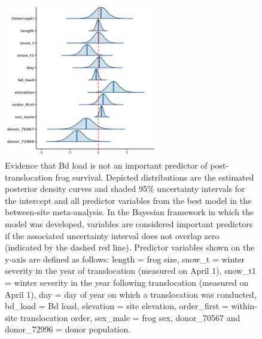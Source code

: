 \documentclass[9pt,twoside,lineno]{pnas-new}
\begin{document}
\begin{figure}

{\centering \includegraphics[width=0.60\textwidth]{figures/mcmc_areas_m1d.png}

}

\caption{\label{fig-survival-postdens}Evidence that Bd load is not an
important predictor of post-translocation frog survival. Depicted
distributions are the estimated posterior density curves and shaded 95\%
uncertainty intervals for the intercept and all predictor variables from
the best model in the between-site meta-analysis. In the Bayesian
framework in which the model was developed, variables are considered
important predictors if the associated uncertainty interval does not
overlap zero (indicated by the dashed red line). Predictor variables
shown on the y-axis are defined as follows: length = frog size, snow\_t
= winter severity in the year of translocation (measured on April 1),
snow\_t1 = winter severity in the year following translocation (measured
on April 1), day = day of year on which a translocation was conducted,
bd\_load = Bd load, elevation = site elevation, order\_first =
within-site translocation order, sex\_male = frog sex, donor\_70567 and
donor\_72996 = donor population.}

\end{figure}\clearpage

\newpage
\end{document}
